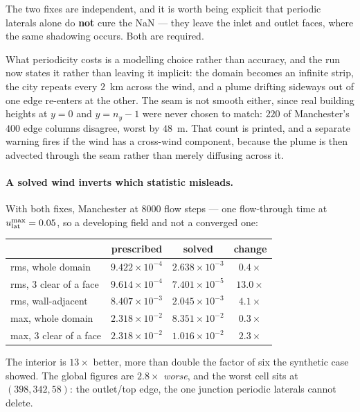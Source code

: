 \documentclass[11pt,a4paper]{article}
\begin{document}
The two fixes are independent, and it is worth being explicit that periodic
laterals alone do \textbf{not} cure the NaN --- they leave the inlet and outlet
faces, where the same shadowing occurs. Both are required.

What periodicity costs is a modelling choice rather than accuracy, and the run
now states it rather than leaving it implicit: the domain becomes an infinite
strip, the city repeats every $2$~km across the wind, and a plume drifting
sideways out of one edge re-enters at the other. The seam is not smooth either,
since real building heights at $y=0$ and $y=n_y-1$ were never chosen to match:
$220$ of Manchester's $400$ edge columns disagree, worst by $48$~m. That count
is printed, and a separate warning fires if the wind has a cross-wind component,
because the plume is then advected through the seam rather than merely diffusing
across it.

\paragraph{A solved wind inverts which statistic misleads.} With both fixes,
Manchester at $8000$ flow steps --- one flow-through time at
$u^{\max}_{\rm lat} = 0.05$, so a developing field and not a converged one:

\begin{center}\small
\begin{tabular}{lccc}
\toprule
 & prescribed & solved & change \\
\midrule
rms, whole domain      & $9.422\times10^{-4}$ & $2.638\times10^{-3}$ & $0.4\times$ \\
rms, 3 clear of a face & $9.614\times10^{-4}$ & $7.401\times10^{-5}$ & $\bm{13.0\times}$ \\
rms, wall-adjacent     & $8.407\times10^{-3}$ & $2.045\times10^{-3}$ & $4.1\times$ \\
max, whole domain      & $2.318\times10^{-2}$ & $8.351\times10^{-2}$ & $0.3\times$ \\
max, 3 clear of a face & $2.318\times10^{-2}$ & $1.016\times10^{-2}$ & $2.3\times$ \\
\bottomrule
\end{tabular}
\end{center}

\noindent The interior is $13\times$ better, more than double the factor of six
the synthetic case showed. The global figures are $2.8\times$ \emph{worse}, and
the worst cell sits at $(398,342,58)$: the outlet/top edge, the one junction
periodic laterals cannot delete.
\end{document}
